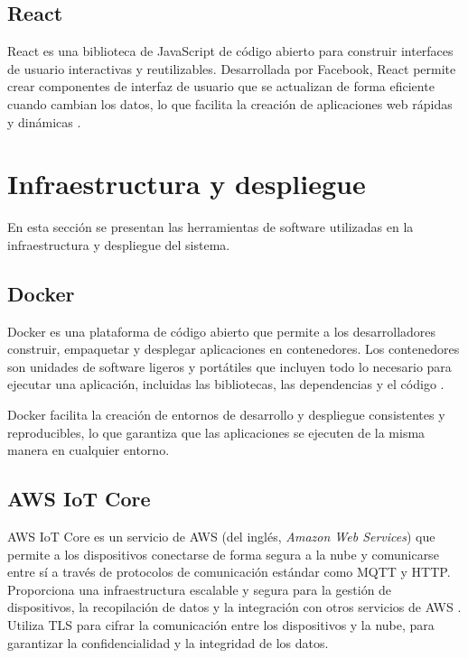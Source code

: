 \subsection{React}

React es una biblioteca de JavaScript de código abierto para construir
interfaces de usuario interactivas y reutilizables. Desarrollada por Facebook,
React permite crear componentes de interfaz de usuario que se actualizan de
forma eficiente cuando cambian los datos, lo que facilita la creación de
aplicaciones web rápidas y dinámicas \cite{React}.


\section{Infraestructura y despliegue}

En esta sección se presentan las herramientas de software utilizadas en la
infraestructura y despliegue del sistema.
\subsection{Docker}

Docker es una plataforma de código abierto que permite a los desarrolladores %
construir, empaquetar y desplegar aplicaciones en contenedores. Los
contenedores son unidades de software ligeros y portátiles que incluyen todo lo
necesario para ejecutar una aplicación, incluidas las bibliotecas, las
dependencias y el código \cite{Docker}.

Docker facilita la creación de entornos de desarrollo y despliegue consistentes
y reproducibles, lo que garantiza que las aplicaciones se ejecuten de la misma
manera en cualquier entorno.

\subsection{AWS IoT Core}

AWS IoT Core es un servicio de AWS (del inglés, \textit{Amazon Web Services})
que permite a los dispositivos conectarse de forma segura a la nube y
comunicarse entre sí a través de protocolos de comunicación estándar como MQTT
y HTTP. Proporciona una infraestructura escalable y segura para la gestión de
dispositivos, la recopilación de datos y la integración con otros servicios de
AWS \cite{AWS_IoT}. Utiliza TLS para cifrar la comunicación entre los
dispositivos y la nube, para garantizar la confidencialidad y la integridad de
los datos.

